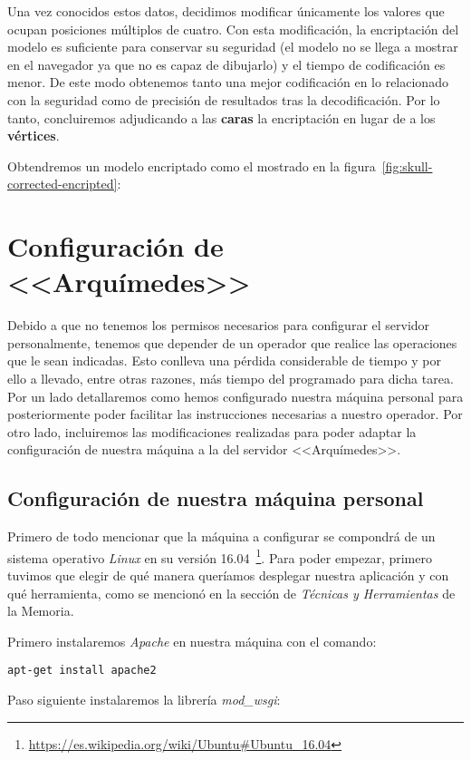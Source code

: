 Una vez conocidos estos datos, decidimos modificar únicamente los valores que ocupan posiciones múltiplos de cuatro. Con esta modificación, la encriptación del modelo es suficiente para conservar su seguridad (el modelo no se llega a mostrar en el navegador ya que no es capaz de dibujarlo) y el tiempo de codificación es menor. De este modo obtenemos tanto una mejor codificación en lo relacionado con la seguridad como de precisión de resultados tras la decodificación. Por lo tanto, concluiremos adjudicando a las \textbf{caras} la encriptación en lugar de a los \textbf{vértices}.

Obtendremos un modelo encriptado como el mostrado en la figura~\ref{fig:skull-corrected-encripted}:

\section{Configuración de  <<Arquímedes>>}\label{sec:arquimedes-conf}
Debido a que no tenemos los permisos necesarios para configurar el servidor personalmente, tenemos que depender de un operador que realice las operaciones que le sean indicadas. Esto conlleva una pérdida considerable de tiempo y por ello a llevado, entre otras razones, más tiempo del programado para dicha tarea. Por un lado detallaremos como hemos configurado nuestra máquina personal para posteriormente poder facilitar las instrucciones necesarias a nuestro operador. Por otro lado, incluiremos las modificaciones realizadas para poder adaptar la configuración de nuestra máquina a la del servidor <<Arquímedes>>.

\subsection{Configuración de nuestra máquina personal}\label{sec:maq-pers-conf}
Primero de todo mencionar que la máquina a configurar se compondrá de un sistema operativo \textit{Linux} en su versión 16.04~\footnote{\url{https://es.wikipedia.org/wiki/Ubuntu\#Ubuntu\_16.04}}. Para poder empezar, primero tuvimos que elegir de qué manera queríamos desplegar nuestra aplicación y con qué herramienta, como se mencionó en la sección de \textit{Técnicas y Herramientas} de la Memoria.

Primero instalaremos \textit{Apache} en nuestra máquina con el comando:

\noindent\verb|apt-get install apache2|

Paso siguiente instalaremos la librería \textit{mod\_wsgi}:


